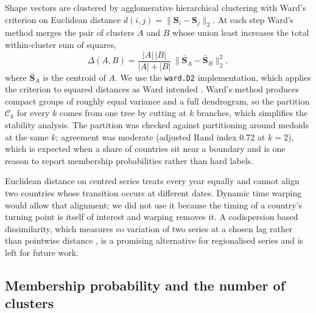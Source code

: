 \documentclass[11pt,a4paper]{article}
\newcommand{\bS}{\mathbf{S}}
\begin{document}
Shape vectors are clustered by agglomerative hierarchical clustering with Ward's criterion on Euclidean distance $d(i,j) = \lVert \bS_i - \bS_j \rVert_2$. At each step Ward's method merges the pair of clusters $A$ and $B$ whose union least increases the total within-cluster sum of squares,
\begin{equation}\label{eq:ward}
\Delta(A, B) = \frac{|A|\,|B|}{|A| + |B|}\, \lVert \bar{\bS}_A - \bar{\bS}_B \rVert_2^2,
\end{equation}
where $\bar{\bS}_A$ is the centroid of $A$. We use the \texttt{ward.D2} implementation, which applies the criterion to squared distances as Ward intended \citep{murtagh2014}. Ward's method produces compact groups of roughly equal variance and a full dendrogram, so the partition $\mathcal{C}_k$ for every $k$ comes from one tree by cutting at $k$ branches, which simplifies the stability analysis. The partition was checked against partitioning around medoids at the same $k$; agreement was moderate (adjusted Rand index 0.72 at $k = 2$), which is expected when a share of countries sit near a boundary and is one reason to report membership probabilities rather than hard labels.

Euclidean distance on centred series treats every year equally and cannot align two countries whose transition occurs at different dates. Dynamic time warping would allow that alignment; we did not use it because the timing of a country's turning point is itself of interest and warping removes it. A codispersion based dissimilarity, which measures co variation of two series at a chosen lag rather than pointwise distance \citep{fouedjio2026}, is a promising alternative for regionalised series and is left for future work.

\subsection{Membership probability and the number of clusters}\label{sec:stability}
\end{document}
